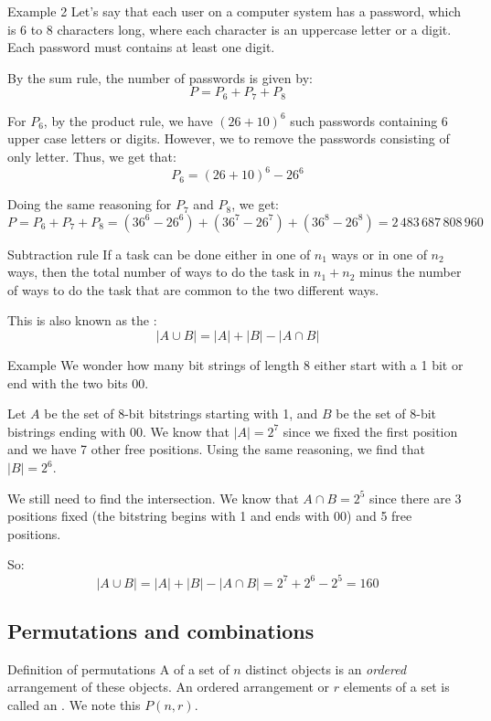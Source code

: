 \documentclass[a4paper]{article}
\begin{document}
\begin{parag}{Example 2}
    Let's say that each user on a computer system has a password, which is 6 to 8 characters long, where each character is an uppercase letter or a digit. Each password must contains at least one digit. 

    By the sum rule, the number of passwords is given by: 
    \[P = P_6 + P_7 + P_8\]
    
    For $P_6$, by the product rule, we have $\left(26 + 10\right)^6$ such passwords containing 6 upper case letters or digits. However, we to remove the passwords consisting of only letter. Thus, we get that: 
    \[P_6 = \left(26 + 10\right)^6 - 26^6\]

    Doing the same reasoning for $P_7$ and $P_8$, we get: 
    \[P = P_6 + P_7 + P_8 = \left(36^6 - 26^6\right) + \left(36^7 - 26^7\right) + \left(36^8 - 26^8\right) = 2\,483\,687\,808\,960\]
\end{parag}

\begin{parag}{Subtraction rule}
    If a task can be done either in one of $n_1$ ways or in one of $n_2$ ways, then the total number of ways to do the task in $n_1 + n_2$ minus the number of ways to do the task that are common to the two different ways.

    This is also known as the :
    \[\left|A \cup B\right| = \left|A\right| + \left|B\right| - \left|A \cap B\right|\]
\end{parag}

\begin{parag}{Example}
    We wonder how many bit strings of length 8 either start with a 1 bit or end with the two bits 00.

    Let $A$ be the set of 8-bit bitstrings starting with 1, and $B$ be the set of 8-bit bistrings ending with 00. We know that $\left|A\right| = 2^7$ since we fixed the first position and we have 7 other free positions. Using the same reasoning, we find that $\left|B\right| = 2^6$.

    We still need to find the intersection. We know that $A \cap B = 2^5$ since there are 3 positions fixed (the bitstring begins with 1 and ends with 00) and 5 free positions.

    So: 
    \[\left|A \cup B\right| = \left|A\right| + \left|B\right| - \left|A \cap B\right| = 2^7 + 2^6 - 2^5 = 160\]
\end{parag}

\subsection{Permutations and combinations}
\begin{parag}{Definition of permutations}
    A  of a set of $n$ distinct objects is an \textit{ordered} arrangement of these objects. An ordered arrangement or $r$ elements of a set is called an . We note this $P\left(n, r\right)$.
\end{parag}
\end{document}

